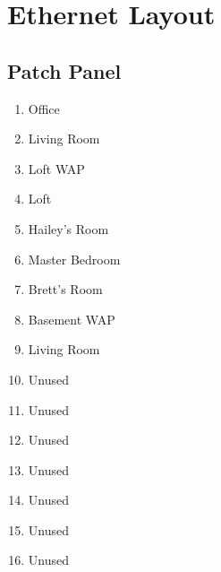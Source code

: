 \documentclass[]{article}
\begin{document}

\newpage

\vspace{\baselineskip}\section*{Ethernet Layout}

\begin{multicols}{2}

\subsection{\texorpdfstring{{Patch Panel}}{Patch Panel}}

\begin{enumerate}
\item
  {Office}
\item
  {Living Room}
\item
  {Loft WAP}
\item
  {Loft}
\item
  {Hailey's Room}
\item
  {Master Bedroom}
\item
  {Brett's Room}
\item
  {Basement WAP}
\item
  {Living Room}
\item
  {Unused}
\item
  {Unused}
\item
  {Unused}
\item
  {Unused}
\item
  {Unused}
\item
  {Unused}
\item
  {Unused}
\end{enumerate}


\end{multicols}
\end{document}
